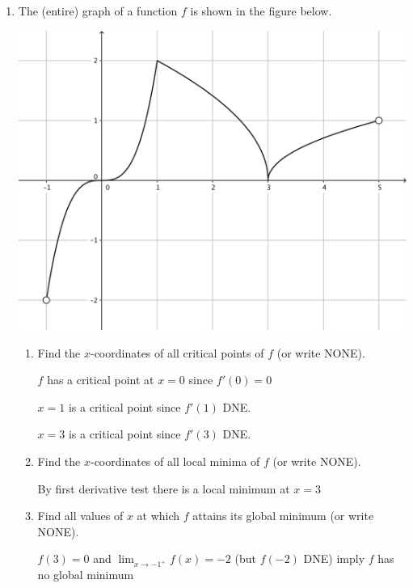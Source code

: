 \documentclass[nooutcomes]{ximera}
\begin{document}
\begin{problem}

  \begin{enumerate}
    \item
      The (entire) graph of a function $f$ is shown in the figure below.
      \begin{image}
        \includegraphics[scale = 0.3]{figure3.png}
      \end{image}
      \begin{enumerate}
        \item
          Find the $x$-coordinates of all critical points of $f$ (or write NONE).
          \begin{freeResponse}
            $f$ has a critical point at $x = 0$ since $f'(0) = 0$

            $x = 1$ is a critical point since $f'(1)$ DNE.

            $x = 3$ is a critical point since $f'(3)$ DNE.
          \end{freeResponse}
        \item
          Find the $x$-coordinates of all local minima of $f$ (or write NONE).
        
          \begin{freeResponse} 
           By first derivative test there is a local minimum at $x=3$
          \end{freeResponse}

        \item
          Find all values of $x$ at which $f$ attains its global minimum (or write NONE).
          \begin{freeResponse}
            $f(3) = 0$ and $\lim_{x \to -1^+} f(x) = -2$ (but $f(-2)$ DNE) imply $f$ has no global minimum
          \end{freeResponse}


\end{enumerate}
\end{enumerate}
\end{problem}
\end{document}
